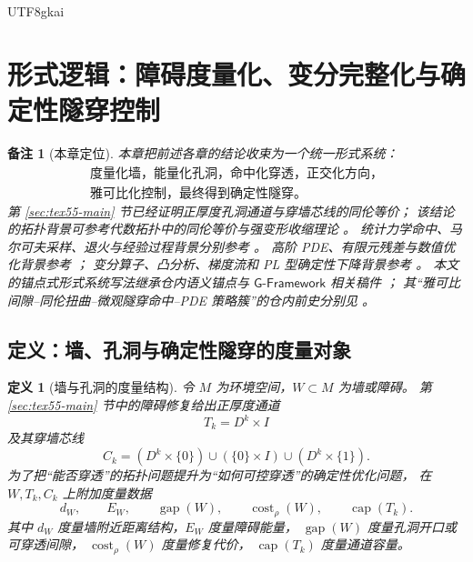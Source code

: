 \documentclass[12pt]{article}
\newtheorem{definition}{定义}[section]
\newtheorem{remark}{备注}[section]
\newcommand{\GFramework}{\textsf{G-Framework}}
\begin{document}
\begin{CJK*}{UTF8}{gkai}
\clearpage

\section{形式逻辑：障碍度量化、变分完整化与确定性隧穿控制}
\label{sec:tex55-metric-variational-deterministic-tunneling}

\begin{remark}[本章定位]
本章把前述各章的结论收束为一个统一形式系统：
\[
  \boxed{
  \begin{gathered}
  \text{度量化墙，能量化孔洞，命中化穿透，正交化方向，}\\
  \text{雅可比化控制，最终得到确定性隧穿。}
  \end{gathered}
  }
\]
第 \ref{sec:tex55-main} 节已经证明正厚度孔洞通道与穿墙芯线的同伦等价；
该结论的拓扑背景可参考代数拓扑中的同伦等价与强变形收缩理论 \cite{Hatcher2002AT}。
统计力学命中、马尔可夫采样、退火与经验过程背景分别参考
\cite{LevinPeresWilmer2017Markov,Norris1998MarkovChains,Kirkpatrick1983Optimization,Hajek1988Cooling,VanDerVaartWellner1996EmpiricalProcesses}。
高阶 PDE、有限元残差与数值优化背景参考
\cite{Evans2010PDE,BrennerScott2008FEM,NocedalWright2006NumericalOptimization}；
变分算子、凸分析、梯度流和 PL 型确定性下降背景参考
\cite{GelfandFomin2000CalculusVariations,Rockafellar1970ConvexAnalysis,AmbrosioGigliSavare2008GradientFlows,KarimiNutiniSchmidt2016PL}。
本文的锚点式形式系统写法继承仓内语义锚点与 \(\GFramework\) 相关稿件
\cite{RepoTex37SemanticGauge,RepoTex51TruthAnchor,GaoZheng2025GFramework}；
其“雅可比间隙--同伦扭曲--微观隧穿命中--PDE 策略簇”的仓内前史分别见
\cite{RepoTex28JacGap,RepoTex45ObstructionGlobalSection,RepoTex53StrategyCluster}。
\end{remark}

\subsection{定义：墙、孔洞与确定性隧穿的度量对象}
\label{subsec:tex55-metric-tunneling-definitions}

\begin{definition}[墙与孔洞的度量结构]
\label{def:tex55-wall-hole-metric-structure}
令 \(M\) 为环境空间，\(W\subset M\) 为墙或障碍。
第 \ref{sec:tex55-main} 节中的障碍修复给出正厚度通道
\[
  T_k=D^k\times I
\]
及其穿墙芯线
\[
  C_k=(D^k\times\{0\})\cup(\{0\}\times I)\cup(D^k\times\{1\}).
\]
为了把“能否穿透”的拓扑问题提升为“如何可控穿透”的确定性优化问题，
在 \(W,T_k,C_k\) 上附加度量数据
\[
  d_W,\qquad
  E_W,\qquad
  \operatorname{gap}(W),\qquad
  \operatorname{cost}_\rho(W),\qquad
  \operatorname{cap}(T_k).
\]
其中 \(d_W\) 度量墙附近距离结构，\(E_W\) 度量障碍能量，
\(\operatorname{gap}(W)\) 度量孔洞开口或可穿透间隙，
\(\operatorname{cost}_\rho(W)\) 度量修复代价，
\(\operatorname{cap}(T_k)\) 度量通道容量。
\end{definition}


\end{CJK*}
\end{document}
